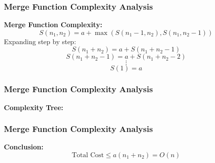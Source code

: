 \begin{frame}
    \frametitle{Merge Function Complexity Analysis}

    \textbf{Merge Function Complexity:}  
    \[
    S(n_1, n_2) = a + \max(S(n_1 - 1, n_2), S(n_1, n_2 - 1))
    \]
    Expanding step by step:
    \[
    S(n_1 + n_2) = a + S(n_1 + n_2 - 1)
    \]
    \[
    S(n_1 + n_2 - 1) = a + S(n_1 + n_2 - 2)
    \]
    \[
    \vdots
    \]
    \[
    S(1) = a
    \]

    
\end{frame}


\begin{frame}
 \frametitle{Merge Function Complexity Analysis}
\textbf{Complexity Tree:}
    \begin{center}
    \end{center}

\end{frame}

\begin{frame}
 \frametitle{Merge Function Complexity Analysis}
 \textbf{Conclusion:}  
    \[
    \text{Total Cost} \leq a(n_1 + n_2) = O(n)
    \]
\end{frame}



